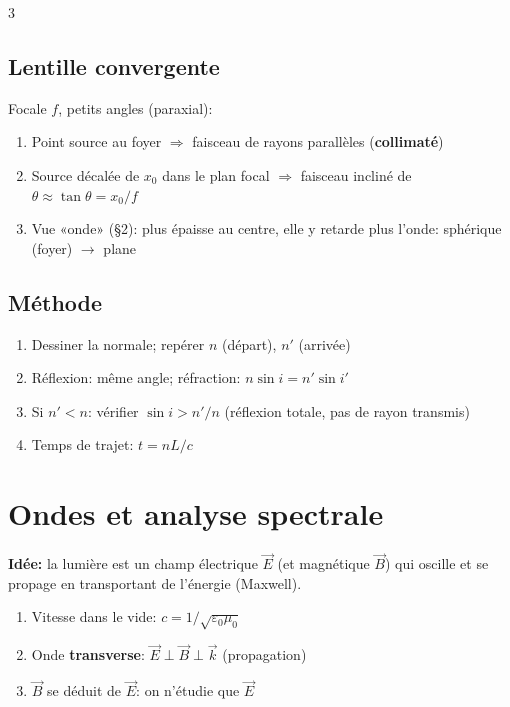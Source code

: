 \documentclass[12pt, a4paper]{article}
\newcommand{\ve}[1]{\vec{#1}}
\begin{document}
\begin{multicols*}{3}
	\subsection{Lentille convergente}
	Focale $f$, petits angles (paraxial):
	\begin{enumerate}[\roman*.]
		\item Point source au foyer $\Rightarrow$ faisceau de rayons parallèles (\textbf{collimaté})
		\item Source décalée de $x_0$ dans le plan focal $\Rightarrow$ faisceau incliné de $\theta\approx\tan\theta=x_0/f$
		\item Vue «onde» (§2): plus épaisse au centre, elle y retarde plus l'onde: sphérique (foyer) $\rightarrow$ plane
	\end{enumerate}

	\subsection{Méthode}
	\begin{enumerate}[\roman*.]
		\item Dessiner la normale; repérer $n$ (départ), $n'$ (arrivée)
		\item Réflexion: même angle; réfraction: $n\sin i=n'\sin i'$
		\item Si $n'<n$: vérifier $\sin i>n'/n$ (réflexion totale, pas de rayon transmis)
		\item Temps de trajet: $t=nL/c$
	\end{enumerate}

	\colbreak
	\section{Ondes et analyse spectrale}
	\textbf{Idée:} la lumière est un champ électrique $\ve E$ (et magnétique $\ve B$) qui oscille et se propage en transportant de l'énergie (Maxwell).
	\begin{enumerate}[\roman*.]
		\item Vitesse dans le vide: $c=1/\sqrt{\varepsilon_0\mu_0}$
		\item Onde \textbf{transverse}: $\ve E\perp\ve B\perp\ve k$ (propagation)
		\item $\ve B$ se déduit de $\ve E$: on n'étudie que $\ve E$
	\end{enumerate}


\end{multicols*}
\end{document}
